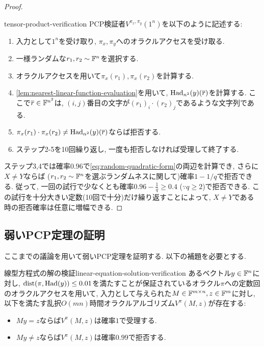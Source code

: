 \begin{proof}
  \begin{algo}{}{tensor-product-verification}
    PCP検証者$V^{\pi_x,\pi_y}(1^n)$を以下のように記述する:
    \begin{enumerate}
      \item 入力として$1^n$を受け取り, $\pi_x,\pi_y$へのオラクルアクセスを受け取る.
      \item 一様ランダムな$r_1,r_2\sim\mathbb{F}^n$を選択する.
      \item オラクルアクセスを用いて$\pi_x(r_1),\pi_x(r_2)$を計算する.
      \item \cref{lem:nearest-linear-function-evaluation}を用いて, $\mathrm{Had}_{n^2}(y)(\overline{r})$を計算する. ここで$\overline{r}\in\mathbb{F}^{n^2}$は, $(i,j)$番目の文字が$(r_1)_i\cdot (r_2)_j$であるような文字列である.
      \item $\pi_x(r_1)\cdot \pi_x(r_2)\ne \mathrm{Had}_{n^2}(y)(\overline{r})$ならば拒否する.
      \item ステップ2-5を10回繰り返し, 一度も拒否しなければ受理して終了する.
    \end{enumerate}
  \end{algo}

  ステップ3,4では確率$0.96$で\cref{eq:random-quadratic-form}の両辺を計算でき,
  さらに$X\ne Y$ならば ($r_1,r_2\sim\mathbb{F}^n$を選ぶランダムネスに関して)確率$1-1/q$で拒否できる.
  従って, 一回の試行で少なくとも確率$0.96-\frac{1}{q} \ge 0.4$ ($\because q\ge 2$)で拒否できる.
  この試行を十分大きい定数(10回で十分)だけ繰り返すことによって, $X\ne Y$である時の拒否確率は任意に増幅できる.
  \end{proof}
  
  \subsection{弱いPCP定理の証明}  
  ここまでの議論を用いて弱いPCP定理を証明する. 以下の補題を必要とする.

  \begin{lemma}{線型方程式の解の検証}{linear-equation-solution-verification}
    あるベクトル$y\in\mathbb{F}^n$に対し, $\mathrm{dist}(\pi,\mathrm{Had}(y))\le 0.01$を満たすことが保証されているオラクル$\pi$への定数回のオラクルアクセスを用いて, 入力として与えられた$M\in\mathbb{F}^{m\times n},z\in\mathbb{F}^m$に対し, 
    以下を満たす乱択$O(mn)$時間オラクルアルゴリズム$V^{\pi}(M,z)$が存在する:
    \begin{itemize}
      \item $My=z$ならば$V^{\pi}(M,z)$は確率$1$で受理する.
      \item $My\ne z$ならば$V^{\pi}(M,z)$は確率$0.99$で拒否する.        
    \end{itemize}
  \end{lemma}
  
